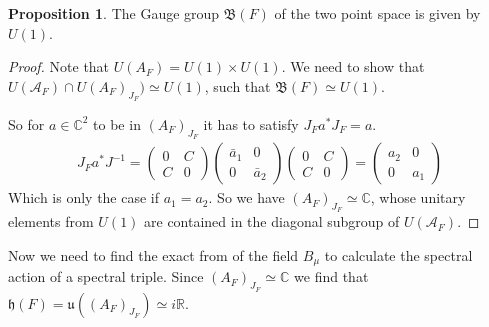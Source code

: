 \documentclass[a4paper]{article}
\theoremstyle{definition}
\theoremstyle{definition}
\theoremstyle{definition}
\theoremstyle{theorem}
\theoremstyle{theorem}
\theoremstyle{theorem}
\newtheorem{proposition}{Proposition}
\begin{document}
    \begin{proposition}
        The Gauge group $\mathfrak{B}(F)$ of the two point space is given by
        $U(1)$.
    \end{proposition}
    \begin{proof}
        Note that $U(A_F) = U(1) \times U(1)$. We need to show that
        $U(\mathcal{A}_F)
        \cap U(A_F)_{J_F}) \simeq U(1)$, such that $\mathfrak{B}(F)
        \simeq U(1)$.\newline

        So for $a \in \mathbb{C}^2$ to be in $(A_F)_{J_F}$ it has
        to satisfy $J_F a^* J_F = a$.
        \begin{align}
            J_F a^* J^{-1} =
            \begin{pmatrix}0&C\\C&0\end{pmatrix}
                \begin{pmatrix}\bar{a}_1&0\\0&\bar{a}_2\end{pmatrix}
            \begin{pmatrix}0&C\\C&0\end{pmatrix}
                =
                \begin{pmatrix}a_2&0\\0&a_1\end{pmatrix}
        \end{align}
        Which is only the case if $a_1 = a_2$. So we have
        $(A_F)_{J_F} \simeq \mathbb{C}$, whose unitary elements
        from $U(1)$ are contained in the diagonal subgroup of
        $U(\mathcal{A}_F)$.
    \end{proof}

    Now we need to find the exact from of the field $B_\mu$ to calculate the
    spectral action of a spectral triple. Since $(A_F)_{J_F} \simeq
    \mathbb{C}$ we find that $\mathfrak{h}(F) = \mathfrak{u}((A_F)_{J_F})
    \simeq i\mathbb{R}$.\newline
\end{document}
